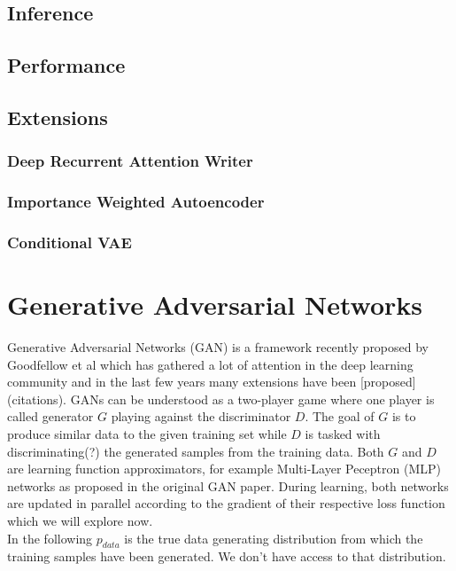 \documentclass[twoside,11pt,a4paper]{article}
\theoremstyle{break}
\begin{document}
\subsection{Inference}
\label{sub:vae_inference}

\subsection{Performance}
\label{sub:vae_performance}

\subsection{Extensions}
\label{sub:vae_extensions}

\subsubsection{Deep Recurrent Attention Writer}
\label{ssub:vae_deep_recurrent_attention_writer}

\subsubsection{Importance Weighted Autoencoder}
\label{ssub:vae_importance_weighted_autoencoder}

\subsubsection{Conditional VAE}
\label{ssub:vae_conditional_vae}









\section{Generative Adversarial Networks}
\label{sec:gan}

Generative Adversarial Networks (GAN) is a framework recently proposed by Goodfellow et al which has gathered a lot of attention in the deep learning community and in the last few years many extensions have been [proposed] (citations).
GANs can be understood as a two-player game where one player is called generator $G$ playing against the discriminator $D$.
The goal of $G$ is to produce similar data to the given training set while $D$ is tasked with discriminating(?) the generated samples from the training data. Both $G$ and $D$ are learning function approximators, for example Multi-Layer Peceptron (MLP) networks as proposed in the original GAN paper.
During learning, both networks are updated in parallel according to the gradient of their respective loss function which we will explore now.\\
In the following $p_{data}$ is the true data generating distribution from which the training samples have been generated.
We don't have access to that distribution.
\end{document}
